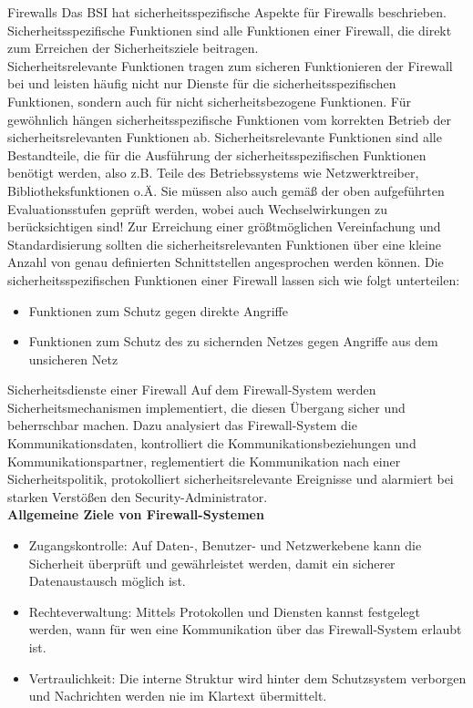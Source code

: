  \pagebreak
 \label{Firewalls}
 \begin{section}{Firewalls}
	Das BSI hat sicherheitsspezifische Aspekte für Firewalls beschrieben.
	Sicherheitsspezifische Funktionen sind alle Funktionen einer Firewall, 
	die direkt zum Erreichen der Sicherheitsziele beitragen. \\
	
	Sicherheitsrelevante Funktionen tragen zum sicheren Funktionieren der Firewall 
	bei und leisten häufig nicht nur Dienste für die sicherheitsspezifischen Funktionen, 
	sondern auch für nicht sicherheitsbezogene Funktionen. Für gewöhnlich hängen 
	sicherheitsspezifische Funktionen vom korrekten Betrieb der sicherheitsrelevanten Funktionen ab. 
	Sicherheitsrelevante Funktionen sind alle Bestandteile, die für die Ausführung der 
	sicherheitsspezifischen Funktionen benötigt werden, also z.B. 
	Teile des Betriebssystems wie Netzwerktreiber, Bibliotheksfunktionen o.Ä. 
	Sie müssen also auch gemäß der oben aufgeführten Evaluationsstufen geprüft werden, 
	wobei auch Wechselwirkungen zu berücksichtigen sind! 
	Zur Erreichung einer größtmöglichen Vereinfachung und Standardisierung sollten die 
	sicherheitsrelevanten Funktionen über eine kleine Anzahl von genau definierten Schnittstellen 
	angesprochen werden können.
	Die sicherheitsspezifischen Funktionen einer Firewall lassen sich wie folgt unterteilen:
	\begin{itemize}
		\item Funktionen zum Schutz gegen direkte Angriffe
		\item Funktionen zum Schutz des zu sichernden Netzes gegen Angriffe aus dem unsicheren Netz
	\end{itemize}
	\pagebreak
	
  \label{Sicherheitsdienste einer Firewall}
  \begin{subsection}{Sicherheitsdienste einer Firewall}
  	Auf dem Firewall-System werden Sicherheitsmechanismen implementiert, die diesen Übergang 
  	sicher und beherrschbar machen. Dazu analysiert das Firewall-System die Kommunikationsdaten, 
  	kontrolliert die Kommunikationsbeziehungen und Kommunikationspartner, 
  	reglementiert die Kommunikation nach einer Sicherheitspolitik, protokolliert sicherheitsrelevante 
  	Ereignisse und alarmiert bei starken Verstößen den Security-Administrator. \\
  	
  	\textbf{Allgemeine Ziele von Firewall-Systemen}
  	\begin{itemize}
  		\item Zugangskontrolle:
  			Auf Daten-, Benutzer- und Netzwerkebene kann die Sicherheit überprüft und gewährleistet werden, 
  			damit ein sicherer Datenaustausch möglich ist.
  		\item Rechteverwaltung:
  			Mittels Protokollen und Diensten kannst festgelegt werden, wann für wen eine Kommunikation über das 
  			Firewall-System erlaubt ist.
  		\item Vertraulichkeit:
  			Die interne Struktur wird hinter dem Schutzsystem verborgen und Nachrichten werden nie im Klartext 
  			übermittelt.
  	\end{itemize}
  	

\end{subsection}
\end{section}

